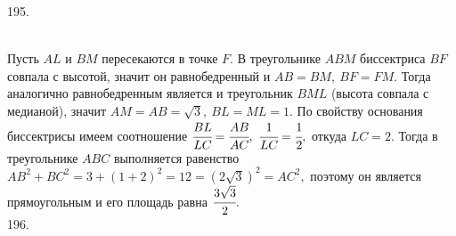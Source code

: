 \documentclass[12pt]{article}
\begin{document}
195. \begin{figure}[ht!]
\end{figure}\\
Пусть $AL$ и $BM$ пересекаются в точке $F.$ В треугольнике $ABM$ биссектриса $BF$ совпала с высотой, значит он равнобедренный и $AB=BM,\ BF=FM.$ Тогда аналогично равнобедренным является и треугольник $BML$ (высота совпала с медианой), значит $AM=AB=\sqrt{3},\ BL=ML=1.$ По свойству основания биссектрисы имеем соотношение
$\cfrac{BL}{LC}=\cfrac{AB}{AC},\ \cfrac{1}{LC}=\cfrac{1}{2},$ откуда $LC=2.$ Тогда в треугольнике $ABC$ выполняется равенство $AB^2+BC^2=3+(1+2)^2=12=(2\sqrt{3})^2=AC^2,$ поэтому он является прямоугольным и его площадь равна $\cfrac{3\sqrt{3}}{2}.$\\
196. \begin{figure}[ht!]
\end{figure}\\
\end{document}
